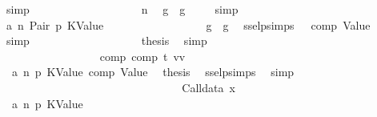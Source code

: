 \begin{isabellebody}
\ simp\isanewline
\ \ \ \ \ \ \ \ \ \ \ \ \ \ \ \ \isamarkupfalse%
\ \isamarkupfalse%
\ n\ \isamarkupfalse%
\ {\isachardoublequoteopen}g{\isacharprime}{\kern0pt}\ {\isasymle}\ g{\isachardoublequoteclose}\ \isamarkupfalse%
\ {}{\isacharparenleft}{\kern0pt}{}{\isacharparenright}{\kern0pt}\ \isamarkupfalse%
\ simp\isanewline
\ \ \ \ \ \ \ \ \ \ \ \ \ \ \ \ \isamarkupfalse%
\ \isamarkupfalse%
\ a{}\ n\ Pair\ p{}\ KValue\isanewline
\ \ \ \ \ \ \ \ \ \ \ \ \ \ \ \ \isamarkupfalse%
\ {\isachardoublequoteopen}g{}{\isacharprime}{\kern0pt}\ {\isasymle}\ g{\isacharprime}{\kern0pt}{\isachardoublequoteclose}\ \isamarkupfalse%
\ ssel{\isachardot}{\kern0pt}psimps{\isacharparenleft}{\kern0pt}{}{\isacharparenright}{\kern0pt}\ {}{\isacharparenleft}{\kern0pt}{}{\isacharparenright}{\kern0pt}\ {}{\isacharparenleft}{\kern0pt}{}{\isacharparenright}{\kern0pt}\ comp\ Value\ \isamarkupfalse%
\ simp\isanewline
\ \ \ \ \ \ \ \ \ \ \ \ \ \ \ \ \isamarkupfalse%
\ \isamarkupfalse%
\ {\isacharquery}{\kern0pt}thesis\ \isamarkupfalse%
\ simp\ \ \isanewline
\ \ \ \ \ \ \ \ \ \ \ \ \ \ \ \ \isanewline
\ \ \ \ \ \ \ \ \ \ \ \ \ \ \isamarkupfalse%
\isanewline
\ \ \ \ \ \ \ \ \ \ \ \ \ \ \ \ \isamarkupfalse%
\ comp{\isacharcolon}{\kern0pt}\ {\isachardoublequoteopen}{\isasymnot}comp\ t{\isacharprime}{\kern0pt}{\isacharprime}{\kern0pt}\ vv{\isachardoublequoteclose}\isanewline
\ \ \ \ \ \ \ \ \ \ \ \ \ \ \ \ \isamarkupfalse%
\ {}\ a{}\ n\ p{}\ KValue\ comp\ Value\ \isamarkupfalse%
\ {\isacharquery}{\kern0pt}thesis\ \isamarkupfalse%
\ ssel{\isachardot}{\kern0pt}psimps{\isacharparenleft}{\kern0pt}{}{\isacharparenright}{\kern0pt}\ \isamarkupfalse%
\ simp\isanewline
\ \ \ \ \ \ \ \ \ \ \ \ \ \ \isamarkupfalse%
\isanewline
\isanewline
\ \ \ \ \ \ \ \ \ \ \ \ \ \ \isamarkupfalse%
\isanewline
\ \ \ \ \ \ \ \ \ \ \ \ \ \ \ \ \isamarkupfalse%
\ {\isacharparenleft}{\kern0pt}Calldata\ x{}{\isacharparenright}{\kern0pt}\isanewline
\ \ \ \ \ \ \ \ \ \ \ \ \ \ \ \ \isamarkupfalse%
\ {}\ a{}\ n\ p{}\ KValue\ \isamarkupfalse%

\end{isabellebody}
